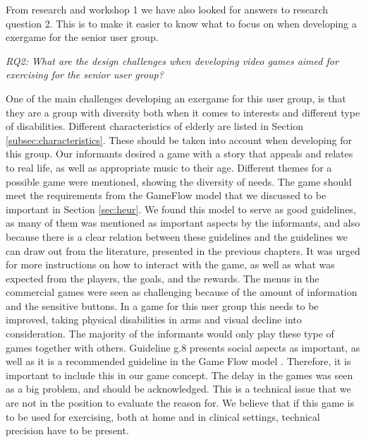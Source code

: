 From research and workshop 1 we have also looked for answers to research question 2. This is to make it easier to know what to focus on when developing a exergame for the senior user group.

\emph{RQ2: What are the design challenges when developing video games aimed for exercising for the senior user group?}

One of the main challenges developing an exergame for this user group, is that they are a group with diversity both when it comes to interests and different type of disabilities. Different characteristics of elderly are listed in Section \ref{subsec:characteristics}. These should be taken into account when developing for this group. Our informants desired a game with a story that appeals and relates to real life, as well as appropriate music to their age. Different themes for a possible game were mentioned, showing the diversity of needs. The game should meet the requirements from the GameFlow model \cite{sweetser} that we discussed to be important in Section \ref{sec:heur}. We found this model to serve as good guidelines, as many of them was mentioned as important aspects by the informants, and also because there is a clear relation between these guidelines and the guidelines we can draw out from the literature, presented in the previous chapters. It was urged for more instructions on how to interact with the game, as well as what was expected from the players, the goals, and the rewards. The menus in the commercial games were seen as challenging because of the amount of information and the sensitive buttons. In a game for this user group this needs to be improved, taking physical disabilities in arms and visual decline into consideration. The majority of the informants would only play these type of games together with others. Guideline g.8 presents social aspects as important, as well as it is a recommended guideline in the Game Flow model \cite{sweetser}. Therefore, it is important to include this in our game concept. The delay in the games was seen as a big problem, and should be acknowledged.  This is a technical issue that we are not in the position to evaluate the reason for. We believe that if this game is to be used for exercising, both at home and in clinical settings, technical precision have to be present. 

